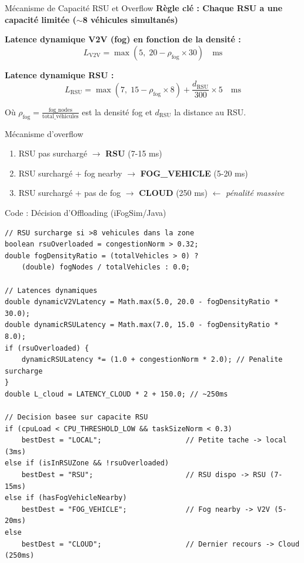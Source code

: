 \documentclass[10pt,aspectratio=169]{beamer}
\begin{document}
\begin{frame}{M\'ecanisme de Capacit\'e RSU et Overflow}
\textbf{R\`egle cl\'e : Chaque RSU a une capacit\'e limit\'ee ($\sim$8 v\'ehicules simultan\'es)}

\vspace{0.2cm}
\textbf{Latence dynamique V2V (fog) en fonction de la densit\'e :}
\begin{equation}
L_{\text{V2V}} = \max\left(5, \; 20 - \rho_{\text{fog}} \times 30\right) \quad \text{ms}
\end{equation}

\textbf{Latence dynamique RSU :}
\begin{equation}
L_{\text{RSU}} = \max\left(7, \; 15 - \rho_{\text{fog}} \times 8\right) + \frac{d_{\text{RSU}}}{300} \times 5 \quad \text{ms}
\end{equation}

O\`u $\rho_{\text{fog}} = \frac{\text{fog\_nodes}}{\text{total\_v\'ehicules}}$ est la densit\'e fog et $d_{\text{RSU}}$ la distance au RSU.

\vspace{0.2cm}
\begin{alertblock}{M\'ecanisme d'overflow}
\begin{enumerate}
    \item RSU pas surcharg\'e $\rightarrow$ \textbf{RSU} (7-15 ms)
    \item RSU surcharg\'e + fog nearby $\rightarrow$ \textbf{FOG\_VEHICLE} (5-20 ms)
    \item RSU surcharg\'e + pas de fog $\rightarrow$ \textbf{CLOUD} (250 ms) $\leftarrow$ \textit{p\'enalit\'e massive}
\end{enumerate}
\end{alertblock}
\end{frame}

\begin{frame}[fragile]{Code : D\'ecision d'Offloading (iFogSim/Java)}
\begin{lstlisting}[style=java, title={VehicularFogSimulation.java -- calculateOffloadingDecision()}]
// RSU surcharge si >8 vehicules dans la zone
boolean rsuOverloaded = congestionNorm > 0.32;
double fogDensityRatio = (totalVehicles > 0) ? 
    (double) fogNodes / totalVehicles : 0.0;

// Latences dynamiques
double dynamicV2VLatency = Math.max(5.0, 20.0 - fogDensityRatio * 30.0);
double dynamicRSULatency = Math.max(7.0, 15.0 - fogDensityRatio * 8.0);
if (rsuOverloaded) {
    dynamicRSULatency *= (1.0 + congestionNorm * 2.0); // Penalite surcharge
}
double L_cloud = LATENCY_CLOUD * 2 + 150.0; // ~250ms

// Decision basee sur capacite RSU
if (cpuLoad < CPU_THRESHOLD_LOW && taskSizeNorm < 0.3)
    bestDest = "LOCAL";                    // Petite tache -> local (3ms)
else if (isInRSUZone && !rsuOverloaded)
    bestDest = "RSU";                      // RSU dispo -> RSU (7-15ms)
else if (hasFogVehicleNearby)
    bestDest = "FOG_VEHICLE";              // Fog nearby -> V2V (5-20ms)
else
    bestDest = "CLOUD";                    // Dernier recours -> Cloud (250ms)
\end{lstlisting}
\end{frame}
\end{document}
